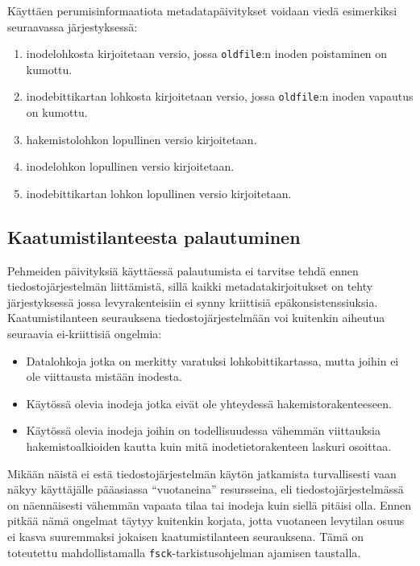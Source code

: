 Käyttäen perumisinformaatiota metadatapäivitykset voidaan viedä esimerkiksi seuraavassa järjestyksessä:
\begin{enumerate}
    \item{inodelohkosta kirjoitetaan versio,
          jossa \texttt{oldfile}:n inoden poistaminen on kumottu.}
    \item{inodebittikartan lohkosta kirjoitetaan versio,
          jossa \texttt{oldfile}:n inoden vapautus on kumottu.}
    \item{hakemistolohkon lopullinen versio kirjoitetaan.}
    \item{inodelohkon lopullinen versio kirjoitetaan.}
    \item{inodebittikartan lohkon lopullinen versio kirjoitetaan.}
\end{enumerate}



\subsection{Kaatumistilanteesta palautuminen}
Pehmeiden päivityksiä käyttäessä palautumista ei tarvitse tehdä ennen tiedostojärjestelmän liittämistä,
sillä kaikki metadatakirjoitukset on tehty järjestyksessä jossa levyrakenteisiin ei synny kriittisiä epäkonsistenssiuksia.
Kaatumistilanteen seurauksena tiedostojärjestelmään voi kuitenkin aiheutua seuraavia ei-kriittisiä ongelmia:
\begin{itemize}
    \item{Datalohkoja jotka on merkitty varatuksi lohkobittikartassa, mutta joihin ei ole viittausta mistään inodesta.}
    \item{Käytössä olevia inodeja jotka eivät ole yhteydessä hakemistorakenteeseen.}
    \item{Käytössä olevia inodeja joihin on todellisuudessa vähemmän viittauksia hakemistoalkioiden kautta kuin mitä inodetietorakenteen laskuri osoittaa.}
\end{itemize}
Mikään näistä ei estä tiedostojärjestelmän käytön jatkamista turvallisesti vaan näkyy käyttäjälle pääasiassa ``vuotaneina'' resursseina,
eli tiedostojärjestelmässä on näennäisesti vähemmän vapaata tilaa tai inodeja kuin siellä pitäisi olla.
Ennen pitkää nämä ongelmat täytyy kuitenkin korjata,
jotta vuotaneen levytilan osuus ei kasva suuremmaksi jokaisen kaatumistilanteen seurauksena.
Tämä on toteutettu mahdollistamalla \texttt{fsck}-tarkistusohjelman ajamisen taustalla.

